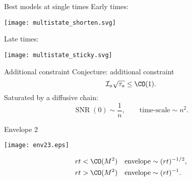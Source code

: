 \documentclass{beamer}%
\DeclareMathOperator{\SNR}{SNR}
\newcommand{\initial}{\mathcal{I}}
\begin{document}

\begin{frame}{Best models at single times}
%
 Early times:
 \begin{center}
   \texttt{[image: multistate\_shorten.svg]}
 \end{center}
 Late times:
 \begin{center}
   \texttt{[image: multistate\_sticky.svg]}
 \end{center}
%
\end{frame}


\begin{frame}{Additional constraint}
%
 Conjecture: additional constraint
 \begin{equation*}
   \initial_a\sqrt{\tau_a} \leq \CO(1).
 \end{equation*}
 Saturated by a diffusive chain:
 \begin{equation*}
   \SNR(0) \sim \frac{1}{n},
   \qquad
   \text{time-scale} \sim n^2.
 \end{equation*}
%
\end{frame}


\begin{frame}{Envelope 2}
%
 \begin{center}
   \texttt{[image: env23.eps]}
 \end{center}
 
 \begin{equation*}
 \begin{aligned}
   rt &< \CO(M^2) &
   \text{envelope} &\sim (rt)^{-1/2}, \\
   rt &> \CO(M^2) &
   \text{envelope} &\sim (rt)^{-1} .
 \end{aligned}
 \end{equation*}
%
\end{frame}
\end{document}
